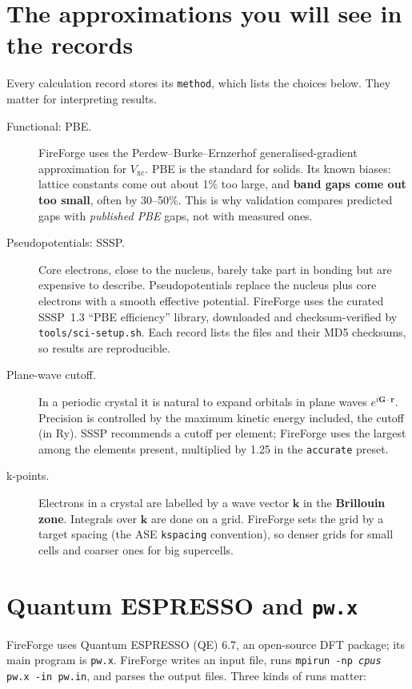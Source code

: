 \documentclass[11pt,a4paper]{report}
\newcommand{\code}[1]{\texttt{#1}}
\begin{document}
\section{The approximations you will see in the records}

Every calculation record stores its \code{method}, which lists the choices below. They matter
for interpreting results.

\begin{description}
\item[Functional: PBE.] FireForge uses the Perdew--Burke--Ernzerhof generalised-gradient
  approximation for $V_\mathrm{xc}$. PBE is the standard for solids. Its known biases:
  lattice constants come out about 1\% too large, and \textbf{band gaps come out too small},
  often by 30--50\%. This is why validation compares predicted gaps with \emph{published PBE}
  gaps, not with measured ones.
\item[Pseudopotentials: SSSP.] Core electrons, close to the nucleus, barely take part in
  bonding but are expensive to describe. Pseudopotentials replace the nucleus plus core
  electrons with a smooth effective potential. FireForge uses the curated SSSP~1.3 ``PBE
  efficiency'' library, downloaded and checksum-verified by \code{tools/sci-setup.sh}. Each
  record lists the files and their MD5 checksums, so results are reproducible.
\item[Plane-wave cutoff.] In a periodic crystal it is natural to expand orbitals in plane
  waves $e^{i\mathbf G\cdot\mathbf r}$. Precision is controlled by the maximum kinetic energy
  included, the cutoff (in Ry). SSSP recommends a cutoff per element; FireForge uses the largest
  among the elements present, multiplied by 1.25 in the \code{accurate} preset.
\item[k-points.] Electrons in a crystal are labelled by a wave vector $\mathbf k$ in the
  \textbf{Brillouin zone}. Integrals over $\mathbf k$ are done on a grid. FireForge sets the
  grid by a target spacing (the ASE \code{kspacing} convention), so denser grids for small
  cells and coarser ones for big supercells.
\end{description}

\section{Quantum ESPRESSO and \code{pw.x}}

FireForge uses Quantum ESPRESSO (QE) 6.7, an open-source DFT package; its main program is
\code{pw.x}. FireForge writes an input file, runs
\code{mpirun -np \textit{cpus} pw.x -in pw.in}, and parses the output files. Three kinds of runs
matter:
\end{document}
